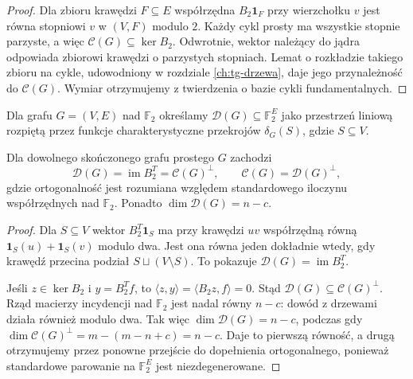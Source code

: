 \begin{proof}
Dla zbioru krawędzi $F\subseteq E$ współrzędna
$B_2\mathbf1_F$ przy wierzchołku $v$ jest równa
stopniowi $v$ w $(V,F)$ modulo $2$.
Każdy cykl prosty ma wszystkie stopnie parzyste, a więc
$\mathcal C(G)\subseteq\ker B_2$.
Odwrotnie, wektor należący do jądra odpowiada zbiorowi
krawędzi o parzystych stopniach. Lemat o rozkładzie takiego
zbioru na cykle, udowodniony w rozdziale
\ref{ch:tg-drzewa}, daje jego przynależność do
$\mathcal C(G)$. Wymiar otrzymujemy z twierdzenia
o bazie cykli fundamentalnych.
\end{proof}

\begin{definicja}
Dla grafu $G=(V,E)$ nad $\mathbb F_2$ określamy
$\mathcal D(G)\subseteq\mathbb F_2^E$ jako przestrzeń
liniową rozpiętą przez funkcje charakterystyczne
przekrojów $\delta_G(S)$, gdzie $S\subseteq V$.
\end{definicja}

\begin{twierdzenie}
\label{thm:tg-orthogonal}
Dla dowolnego skończonego grafu prostego $G$ zachodzi
\[
\mathcal D(G)=\operatorname{im}B_2^T
  =\mathcal C(G)^\perp,\qquad
\mathcal C(G)=\mathcal D(G)^\perp,
\]
gdzie ortogonalność jest rozumiana względem
standardowego iloczynu współrzędnych nad $\mathbb F_2$.
Ponadto $\dim\mathcal D(G)=n-c$.
\end{twierdzenie}

\begin{proof}
Dla $S\subseteq V$ wektor $B_2^T\mathbf1_S$
ma przy krawędzi $uv$ współrzędną równą
$\mathbf1_S(u)+\mathbf1_S(v)$ modulo dwa. Jest ona równa
jeden dokładnie wtedy, gdy krawędź przecina podział
$S\sqcup(V\setminus S)$. To pokazuje
$\mathcal D(G)=\operatorname{im}B_2^T$.

Jeśli $z\in\ker B_2$ i $y=B_2^Tf$, to
$\langle z,y\rangle=\langle B_2z,f\rangle=0$.
Stąd $\mathcal D(G)\subseteq\mathcal C(G)^\perp$.
Rząd macierzy incydencji nad $\mathbb F_2$ jest nadal
równy $n-c$: dowód z drzewami działa również modulo dwa.
Tak więc $\dim\mathcal D(G)=n-c$, podczas gdy
$\dim\mathcal C(G)^\perp=m-(m-n+c)=n-c$.
Daje to pierwszą równość, a drugą otrzymujemy przez
ponowne przejście do dopełnienia ortogonalnego,
ponieważ standardowe parowanie na $\mathbb F_2^E$
jest niezdegenerowane.
\end{proof}

